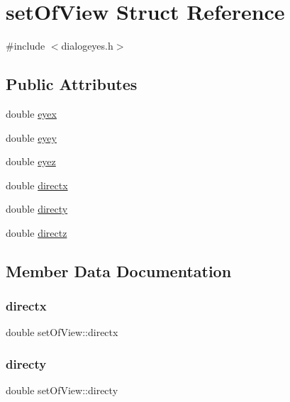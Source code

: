 \hypertarget{structset_of_view}{}\section{set\+Of\+View Struct Reference}
\label{structset_of_view}


{\ttfamily \#include $<$dialogeyes.\+h$>$}

\subsection*{Public Attributes}
\begin{DoxyCompactItemize}
\item 
double \hyperlink{structset_of_view_a0bb9d7f541ae499a85494ccb697e48fc}{eyex}
\item 
double \hyperlink{structset_of_view_af7c9b4ac6d7a4098d3b4639b2763376e}{eyey}
\item 
double \hyperlink{structset_of_view_ae8bf003e65ba68562d248ade07168b8e}{eyez}
\item 
double \hyperlink{structset_of_view_a91713a1fe5754075293a26ff11cbc5fb}{directx}
\item 
double \hyperlink{structset_of_view_a3edfcb674ff889fa9779ff9483ccdd5e}{directy}
\item 
double \hyperlink{structset_of_view_a6c47319cf5b1aadaacb5fbbcdc4ab280}{directz}
\end{DoxyCompactItemize}


\subsection{Member Data Documentation}
\hypertarget{structset_of_view_a91713a1fe5754075293a26ff11cbc5fb}{}\label{structset_of_view_a91713a1fe5754075293a26ff11cbc5fb} 
\subsubsection{\texorpdfstring{directx}{directx}}
{\footnotesize\ttfamily double set\+Of\+View\+::directx}

\hypertarget{structset_of_view_a3edfcb674ff889fa9779ff9483ccdd5e}{}\label{structset_of_view_a3edfcb674ff889fa9779ff9483ccdd5e} 
\subsubsection{\texorpdfstring{directy}{directy}}
{\footnotesize\ttfamily double set\+Of\+View\+::directy}

